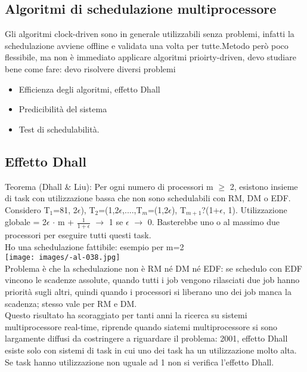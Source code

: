 \documentclass{article}
\begin{document}
\subsection{Algoritmi di schedulazione multiprocessore}
Gli algoritmi clock-driven sono in generale utilizzabili senza problemi, infatti la schedulazione avviene offline e validata una volta per tutte.Metodo però poco flessibile, ma non è immediato applicare algoritmi prioirty-driven, devo studiare bene come fare: devo risolvere diversi problemi
\begin{itemize}
\item Efficienza degli algoritmi, effetto Dhall
\item Predicibilità del sistema
\item Test di schedulabilità.
\end{itemize}
\subsection{Effetto Dhall}
Teorema (Dhall \& Liu): Per ogni numero di processori m $\geq$ 2, esistono insieme di task con utilizzazione bassa che non sono schedulabili con RM, DM o EDF.\\ Considero T$_{1}$=81, 2$\epsilon$), T$_{2}$=(1,2$\epsilon$,....,T$_{m}$=(1,2$\epsilon$), T$_{m+1}$?(1+$\epsilon$, 1). Utilizzazione globale = 2$\epsilon$ $\cdot$ m + $\frac{1}{1+ \epsilon}$ $\rightarrow$ 1 se $\epsilon$ $\rightarrow$ 0. Basterebbe uno o al massimo due processori per eseguire tutti questi task.\\ Ho una schedulazione fattibile: esempio per m=2\\
\texttt{[image: images/-al-038.jpg]}\\
Problema è che la schedulazione non è RM né DM né EDF: se schedulo con EDF vincono le scadenze assolute, quando tutti i job vengono rilasciati due job hanno priorità sugli altri, quindi quando i processori si liberano uno dei job manca la scadenza; stesso vale per RM e DM.\\ Questo risultato ha scoraggiato per tanti anni la ricerca su sistemi multiprocessore real-time, riprende quando siatemi multiprocessore si sono largamente diffusi da costringere a riguardare il problema: 2001, effetto Dhall esiste solo con sistemi di task in cui uno dei task ha un utilizzazione molto alta. Se task hanno utilizzazione non uguale ad 1 non si verifica l'effetto Dhall.
\end{document}
